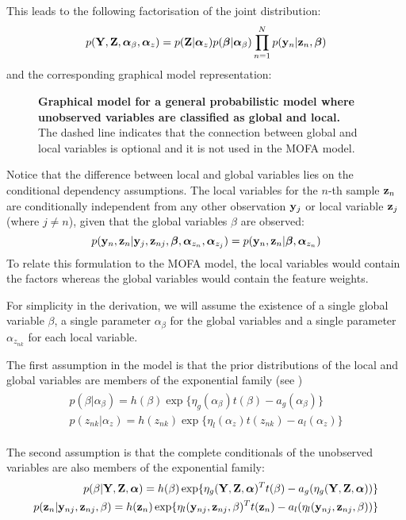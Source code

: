 This leads to the following factorisation of the joint distribution:
\begin{equation}
	p({\bf Y}, {\bf Z}, \mbox{\boldmath $\alpha$}_{\beta}, \mbox{\boldmath $\alpha$}_{z}) = p({\bf Z}|\mbox{\boldmath $\alpha$}_{z}) p(\mbox{\boldmath $\beta$}|\mbox{\boldmath $\alpha$}_{\beta}) \prod_{n=1}^{N} p({\bf y}_{n}|{\bf z}_{n},\mbox{\boldmath $\beta$})
\end{equation}
and the corresponding graphical model representation:
\begin{figure}[H]
	\centering	
	
	\caption{\textbf{Graphical model for a general probabilistic model where unobserved variables are classified as global and local.}\\
	The dashed line indicates that the connection between global and local variables is optional and it is not used in the MOFA model.
	}
	\label{fig:graphical_model_stochastic}
\end{figure}

Notice that the difference between local and global variables lies on the conditional dependency assumptions. The local variables for the $n$-th sample ${\bf z}_n$ are conditionally independent from any other observation ${\bf y}_{j}$ or local variable ${\bf z}_{j}$ (where $j \neq n$), given that the global variables $\beta$ are observed:
\[
	p({\bf y}_n,{\bf z}_n| {\bf y}_j,{\bf z}_{nj},\mbox{\boldmath $\beta$},\mbox{\boldmath $\alpha$}_{z_{n}},\mbox{\boldmath $\alpha$}_{z_{j}}) = p({\bf y}_n,{\bf z}_n|\mbox{\boldmath $\beta$},\mbox{\boldmath $\alpha$}_{z_{n}})
\]
To relate this formulation to the MOFA model, the local variables would contain the factors whereas the global variables would contain the feature weights.

For simplicity in the derivation, we will assume the existence of a single global variable $\beta$, a single parameter $\alpha_{\beta}$ for the global variables and a single parameter $\alpha_{z_{nk}}$ for each local variable.

The first assumption in the model is that the prior distributions of the local and global variables are members of the exponential family (see )
\begin{align} \label{eq_priors} 
	\begin{split}
	p(\beta|\alpha_{\beta}) = h(\beta) \exp\{ \eta_g(\alpha_{\beta}) t(\beta) - a_g(\alpha_{\beta}) \} \\
	p(z_{nk}|\alpha_{z}) = h(z_{nk}) \exp\{ \eta_l(\alpha_{z}) t(z_{nk}) - a_l(\alpha_{z}) \}
	\end{split} 
\end{align}

The second assumption is that the complete conditionals of the unobserved variables are also members of the exponential family:
\begin{align} \label{eq_complete_conditionals} 
	\begin{split}
	p(\beta|{\bf Y},{\bf Z},\mbox{\boldmath $\alpha$}) = h(\beta) \exp\{ \eta_g({\bf Y},{\bf Z},\mbox{\boldmath $\alpha$})^T t(\beta) - a_g(\eta_g({\bf Y},{\bf Z},\mbox{\boldmath $\alpha$})) \} \\
	p({\bf z}_{n}|{\bf y}_{nj},{\bf z}_{nj},\beta) = h({\bf z}_{n}) \exp\{ \eta_l({\bf y}_{nj}, {\bf z}_{nj},\beta)^T t({\bf z}_{n}) - a_l(\eta_l({\bf y}_{nj},{\bf z}_{nj},\beta)) \}
	\end{split} 
\end{align}

